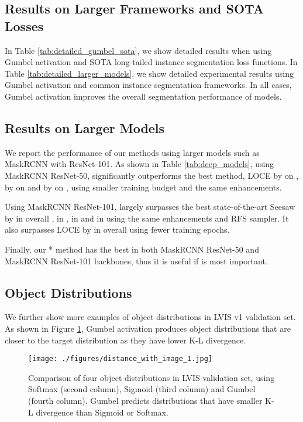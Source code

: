 \documentclass[runningheads]{llncs}
\begin{document}
\subsection{Results on Larger Frameworks and SOTA Losses}
In Table \ref{tab:detailed_gumbel_sota}, we show detailed results when using Gumbel activation and SOTA long-tailed instance segmentation loss functions. In Table \ref{tab:detailed_larger_models}, we show detailed experimental results using Gumbel activation and common instance segmentation frameworks. In all cases, Gumbel activation improves the overall segmentation performance of models.



\subsection{Results on Larger Models}
We report the performance of our methods using larger models such as MaskRCNN with ResNet-101. As shown in Table \ref{tab:deep_models}, using MaskRCNN ResNet-50,  significantly outperforms the best method, LOCE \cite{feng2021exploring} by  on , by  on  and by  on , using smaller training budget and the same enhancements.

Using MaskRCNN ResNet-101,  largely surpasses the best state-of-the-art Seesaw \cite{wang2021seesaw} by  in overall ,  in ,  in  and  in  using the same enhancements and RFS sampler. It also surpasses LOCE by  in overall  using fewer training epochs.

Finally, our * method has the best  in both MaskRCNN ResNet-50 and MaskRCNN ResNet-101 backbones, thus it is useful if  is most important.


\subsection{Object Distributions}
We further show more examples of object distributions in LVIS v1 validation set. As shown in Figure \ref{fig:distance_4}, Gumbel activation produces object distributions that are closer to the target distribution as they have lower K-L divergence.

\begin{figure}[t]
    \centering
    \texttt{[image: ./figures/distance\_with\_image\_1.jpg]}
    \caption{Comparison of four object distributions in LVIS validation set, using Softmax (second column), Sigmoid (third column) and Gumbel (fourth column). Gumbel predicts distributions that have smaller K-L divergence than Sigmoid or Softmax.}
    \label{fig:distance_4}
\end{figure}
\end{document}
